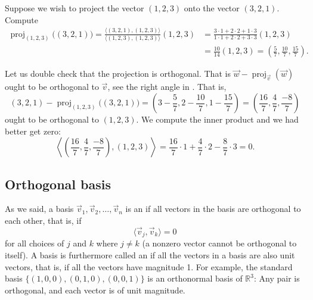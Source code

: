 \documentclass{ximera}
\begin{document}
\begin{example}
    Suppose we wish to project the vector $(1,2,3)$ onto the vector $(3,2,1)$. Compute
    \begin{equation*}
        \begin{split}
            \operatorname{proj}_{(1,2,3)} \bigl( (3,2,1) \bigr)
            = \frac{\langle (3,2,1) , (1,2,3) \rangle}{\langle (1,2,3) , (1,2,3) \rangle} (1,2,3)
            & = \frac{3 \cdot 1 + 2 \cdot 2 + 1 \cdot 3}{ 1 \cdot 1 + 2 \cdot 2 + 3 \cdot 3} (1,2,3) \\
            & = \frac{10}{14} (1,2,3)
            = \left(\frac{5}{7},\frac{10}{7},\frac{15}{7}\right) .
        \end{split}
    \end{equation*}
    
    Let us double check that the projection is orthogonal.  That is $\vec{w}-\operatorname{proj}_{\vec{v}}(\vec{w})$ ought to be orthogonal to $\vec{v}$, see the right angle in .  That is,
    \begin{equation*}
        (3,2,1) - \operatorname{proj}_{(1,2,3)} \bigl( (3,2,1) \bigr)
        = \left(3-\frac{5}{7},2-\frac{10}{7},1-\frac{15}{7}\right)
        = \left(\frac{16}{7},\frac{4}{7},\frac{-8}{7}\right)
    \end{equation*}
    ought to be orthogonal to $(1,2,3)$.  We compute the inner product and we had better get zero:
    \begin{equation*}
        \left\langle\left(\frac{16}{7},\frac{4}{7},\frac{-8}{7}\right) ,(1,2,3) \right\rangle
        = \frac{16}{7} \cdot 1 + \frac{4}{7} \cdot 2 -\frac{8}{7} \cdot 3 = 0 .
    \end{equation*}
\end{example}

\subsection{Orthogonal basis}

As we said, a basis $\vec{v}_1,\vec{v}_2,\ldots,\vec{v}_n$ is an \emph{} if all vectors in the basis are orthogonal to each other, that is, if
\begin{equation*}
    \langle \vec{v}_j , \vec{v}_k \rangle = 0
\end{equation*}
for all choices of $j$ and $k$ where $j \not= k$ (a nonzero vector cannot be orthogonal to itself). A basis is furthermore called an \emph{} if all the vectors in a basis are also unit vectors, that is, if all the vectors have magnitude 1. For example, the standard basis $\{ (1,0,0), (0,1,0), (0,0,1) \}$ is an orthonormal basis of ${\mathbb{R}}^3$: Any pair is orthogonal, and each vector is of unit magnitude.
\end{document}
